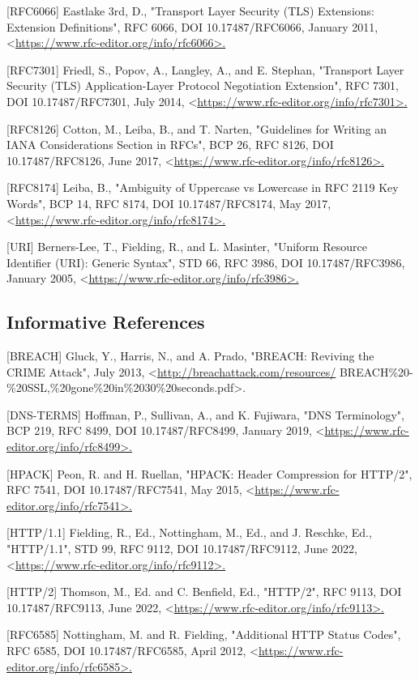 \documentclass{article}
\begin{document}
[RFC6066]  Eastlake 3rd, D., "Transport Layer Security (TLS) Extensions: Extension Definitions", RFC 6066, DOI 10.17487/RFC6066, January 2011, <\url{https://www.rfc-editor.org/info/rfc6066>.}

[RFC7301]  Friedl, S., Popov, A., Langley, A., and E. Stephan, "Transport Layer Security (TLS) Application-Layer Protocol Negotiation Extension", RFC 7301, DOI 10.17487/RFC7301, July 2014, <\url{https://www.rfc-editor.org/info/rfc7301>.}

[RFC8126]  Cotton, M., Leiba, B., and T. Narten, "Guidelines for Writing an IANA Considerations Section in RFCs", BCP 26, RFC 8126, DOI 10.17487/RFC8126, June 2017, <\url{https://www.rfc-editor.org/info/rfc8126>.}

[RFC8174]  Leiba, B., "Ambiguity of Uppercase vs Lowercase in RFC 2119 Key Words", BCP 14, RFC 8174, DOI 10.17487/RFC8174, May 2017, <\url{https://www.rfc-editor.org/info/rfc8174>.}

[URI]      Berners-Lee, T., Fielding, R., and L. Masinter, "Uniform Resource Identifier (URI): Generic Syntax", STD 66, RFC 3986, DOI 10.17487/RFC3986, January 2005, <\url{https://www.rfc-editor.org/info/rfc3986>.}

\subsection{Informative References}

[BREACH]   Gluck, Y., Harris, N., and A. Prado, "BREACH: Reviving the CRIME Attack", July 2013, <\url{http://breachattack.com/resources/} BREACH\%20-\%20SSL,\%20gone\%20in\%2030\%20seconds.pdf>.

[DNS-TERMS] Hoffman, P., Sullivan, A., and K. Fujiwara, "DNS Terminology", BCP 219, RFC 8499, DOI 10.17487/RFC8499, January 2019, <\url{https://www.rfc-editor.org/info/rfc8499>.}

[HPACK]    Peon, R. and H. Ruellan, "HPACK: Header Compression for HTTP/2", RFC 7541, DOI 10.17487/RFC7541, May 2015, <\url{https://www.rfc-editor.org/info/rfc7541>.}

[HTTP/1.1] Fielding, R., Ed., Nottingham, M., Ed., and J. Reschke, Ed., "HTTP/1.1", STD 99, RFC 9112, DOI 10.17487/RFC9112, June 2022, <\url{https://www.rfc-editor.org/info/rfc9112>.}

[HTTP/2]   Thomson, M., Ed. and C. Benfield, Ed., "HTTP/2", RFC 9113, DOI 10.17487/RFC9113, June 2022, <\url{https://www.rfc-editor.org/info/rfc9113>.}

[RFC6585]  Nottingham, M. and R. Fielding, "Additional HTTP Status Codes", RFC 6585, DOI 10.17487/RFC6585, April 2012, <\url{https://www.rfc-editor.org/info/rfc6585>.}
\end{document}
